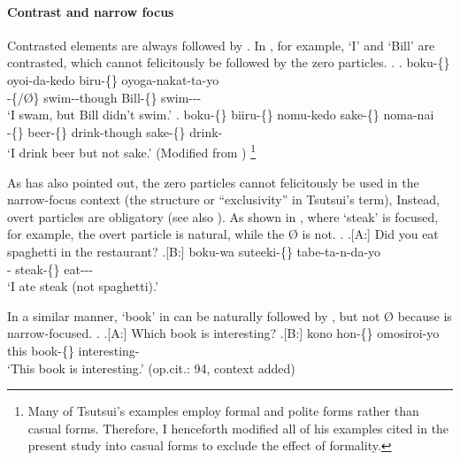 \paragraph{Contrast and narrow focus}

Contrasted elements are always followed by  \cite[53ff.]{tsutsui84}.
In \Next[a], for example,
 `I' and  `Bill' are contrasted,
which cannot felicitously be followed by the zero particles.
%
\ex.
 \ag. boku-\{\} oyoi-da-kedo biru-\{\} oyoga-nakat-ta-yo \\
      -\{/{\O}\} swim--though Bill-\{\} swim--- \\
      `I swam, but Bill didn't swim.'
 \bg. boku-\{\} biiru-\{\} nomu-kedo sake-\{\} noma-nai \\
      -\{\} beer-\{\} drink-though sake-\{\} drink- \\
      `I drink beer but not sake.'
      \hfill{(Modified from )}%
      \footnote{
      Many of Tsutsui's examples employ formal and polite forms
      rather than casual forms.
      Therefore, I henceforth modified all of his examples cited
      in the present study into casual forms
      to exclude the effect of formality.
      }


As  has also pointed out,
the zero particles cannot felicitously be used
in the narrow-focus context
(the  structure or ``exclusivity'' in Tsutsui's term),
Instead, overt particles are obligatory
(see also ).
As shown in \Next[B], where  `steak' is focused, for example,
the overt particle  is natural,
while the  {\O} is not.
%
\ex.
 \a.[A:] Did you eat spaghetti in the restaurant?
 \bg.[B:] boku-wa suteeki-\{\} tabe-ta-n-da-yo \\
          - steak-\{\} eat--- \\
          `I ate steak (not spaghetti).'
          \hfill{\cite[93, context added]{tsutsui84}}

In a similar manner,
 `book' in \Next[B] can be naturally followed by ,
but not {\O}
because  is narrow-focused.
%
\ex.
 \a.[A:] Which book is interesting?
 \bg.[B:] kono hon-\{\} omosiroi-yo \\
          this book-\{\} interesting- \\
          `This book is interesting.'
          \hfill{(op.cit.: 94, context added)}

